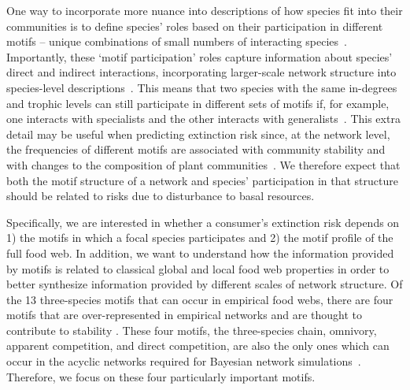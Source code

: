 \documentclass[12pt]{article}
\begin{document}
\begin{spacing}{2.0}
    One way to incorporate more nuance into descriptions of how species fit into their communities is to define species' roles based on their participation in different motifs -- unique combinations of small numbers of interacting species~\citep{Stouffer2007,Stouffer2012}. Importantly, these `motif participation' roles capture information about species' direct and indirect interactions, incorporating larger-scale network structure into species-level descriptions~\citep{Cirtwill2015JAE}. 
    This means that two species with the same in-degrees and trophic levels can still participate in different sets of motifs if, for example, one interacts with specialists and the other interacts with generalists~\citep{Cirtwill2018FoodWebs}. 
    This extra detail may be useful when predicting  extinction risk since, at the network level, the frequencies of different motifs are associated with community stability \citep{prill2005dynamic, bascompte2005simple} and with changes to the composition of plant communities~\cite{giling2019plant}. 
    We therefore expect that both the motif structure of a network and species' participation in that structure should be related to risks due to disturbance to basal resources. 
    
    Specifically, we are interested in whether a consumer's extinction risk depends on 1) the motifs in which a focal species participates and 2) the motif profile of the full food web. 
    In addition, we want to understand how the information provided by motifs is related to classical global and local food web properties in order to better synthesize information provided by different scales of network structure.
    Of the 13 three-species motifs that can occur in empirical food webs, there are four motifs that are over-represented in empirical networks and are thought to contribute to stability \citep{Stouffer2007, Borrelli2015a, giling2019plant}. These four motifs, the three-species chain, omnivory, apparent competition, and direct competition, are also the only ones which can occur in the acyclic networks required for Bayesian network simulations~\citep{Eklof2013}. 
    Therefore, we focus on these four particularly important motifs.  
    


\end{spacing}
\end{document}
